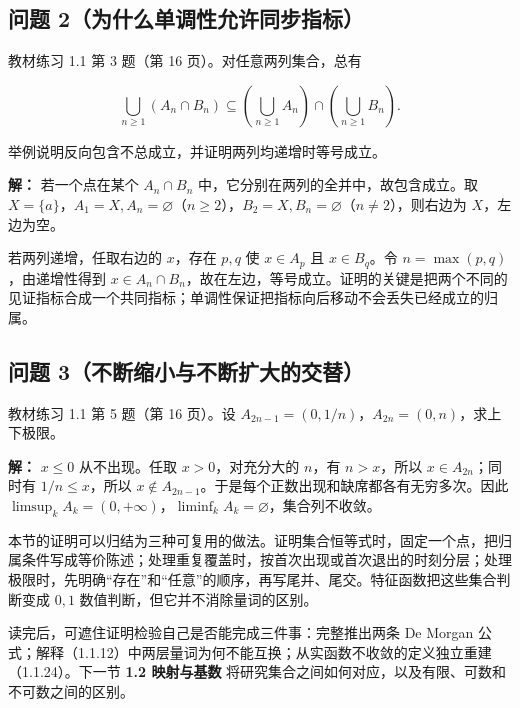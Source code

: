 \documentclass[11pt,a4paper]{article}
\begin{document}
\subsection{问题
2（为什么单调性允许同步指标）}\label{ux95eeux9898-2ux4e3aux4ec0ux4e48ux5355ux8c03ux6027ux5141ux8bb8ux540cux6b65ux6307ux6807}

教材练习 1.1 第 3 题（第 16 页）。对任意两列集合，总有

\begin{equation*}
\bigcup_{n\ge1}(A_n\cap B_n)
\subseteq\left(\bigcup_{n\ge1}A_n\right)\cap\left(\bigcup_{n\ge1}B_n\right).
\tag{1.1.27}
\end{equation*}

举例说明反向包含不总成立，并证明两列均递增时等号成立。

\textbf{解：} 若一个点在某个 \(A_n\cap B_n\)
中，它分别在两列的全并中，故包含成立。取
\(X=\{a\}\)，\(A_1=X,A_n=\varnothing\)（\(n\ge2\)），\(B_2=X,B_n=\varnothing\)（\(n\ne2\)），则右边为
\(X\)，左边为空。

若两列递增，任取右边的 \(x\)，存在 \(p,q\) 使 \(x\in A_p\) 且
\(x\in B_q\)。令 \(n=\max(p,q)\)，由递增性得到
\(x\in A_n\cap B_n\)，故在左边，等号成立。证明的关键是把两个不同的见证指标合成一个共同指标；单调性保证把指标向后移动不会丢失已经成立的归属。

\subsection{问题
3（不断缩小与不断扩大的交替）}\label{ux95eeux9898-3ux4e0dux65adux7f29ux5c0fux4e0eux4e0dux65adux6269ux5927ux7684ux4ea4ux66ff}

教材练习 1.1 第 5 题（第 16 页）。设
\(A_{2n-1}=(0,1/n)\)，\(A_{2n}=(0,n)\)，求上下极限。

\textbf{解：} \(x\le0\) 从不出现。任取 \(x>0\)，对充分大的 \(n\)，有
\(n>x\)，所以 \(x\in A_{2n}\)；同时有 \(1/n\le x\)，所以
\(x\notin A_{2n-1}\)。于是每个正数出现和缺席都各有无穷多次。因此
\(\limsup_k A_k=(0,+\infty)\)，\(\liminf_k A_k=\varnothing\)，集合列不收敛。

本节的证明可以归结为三种可复用的做法。证明集合恒等式时，固定一个点，把归属条件写成等价陈述；处理重复覆盖时，按首次出现或首次退出的时刻分层；处理极限时，先明确``存在''和``任意''的顺序，再写尾并、尾交。特征函数把这些集合判断变成
\(0,1\) 数值判断，但它并不消除量词的区别。

读完后，可遮住证明检验自己是否能完成三件事：完整推出两条 De Morgan
公式；解释（1.1.12）中两层量词为何不能互换；从实函数不收敛的定义独立重建（1.1.24）。下一节
\textbf{1.2 映射与基数}
将研究集合之间如何对应，以及有限、可数和不可数之间的区别。
\end{document}
